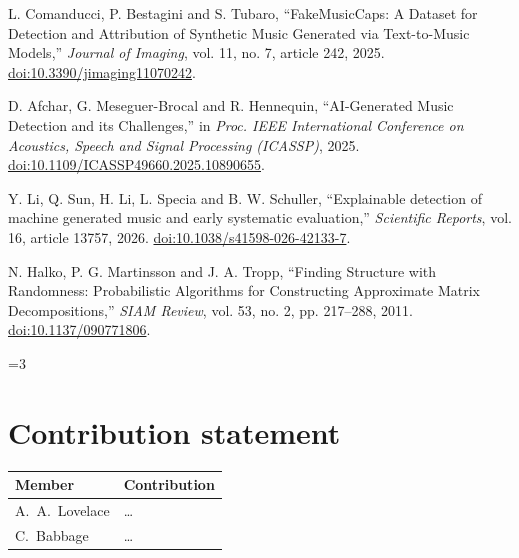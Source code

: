 \documentclass[11pt,a4paper]{article}
\newcommand{\stage}{1}
\newif\ifshowguide
\theoremstyle{plain}
\theoremstyle{definition}
\theoremstyle{remark}
\newcommand{\guide}[1]{\ifshowguide\par\smallskip\noindent
  \colorbox{gray!12}{\parbox{\dimexpr\linewidth-2\fboxsep}{\small\itshape
  \textbf{Guidance.} #1}}\par\smallskip\fi}
\begin{document}
\begin{thebibliography}{9}

L. Comanducci, P. Bestagini and S. Tubaro,
``FakeMusicCaps: A Dataset for Detection and Attribution of Synthetic Music Generated via Text-to-Music Models,''
\emph{Journal of Imaging}, vol. 11, no. 7, article 242, 2025.
\href{https://doi.org/10.3390/jimaging11070242}{doi:10.3390/jimaging11070242}.

D. Afchar, G. Meseguer-Brocal and R. Hennequin,
``AI-Generated Music Detection and its Challenges,'' in
\emph{Proc. IEEE International Conference on Acoustics, Speech and Signal Processing (ICASSP)}, 2025.
\href{https://doi.org/10.1109/ICASSP49660.2025.10890655}{doi:10.1109/ICASSP49660.2025.10890655}.

Y. Li, Q. Sun, H. Li, L. Specia and B. W. Schuller,
``Explainable detection of machine generated music and early systematic evaluation,''
\emph{Scientific Reports}, vol. 16, article 13757, 2026.
\href{https://doi.org/10.1038/s41598-026-42133-7}{doi:10.1038/s41598-026-42133-7}.

N. Halko, P. G. Martinsson and J. A. Tropp,
``Finding Structure with Randomness: Probabilistic Algorithms for Constructing Approximate Matrix Decompositions,''
\emph{SIAM Review}, vol. 53, no. 2, pp. 217--288, 2011.
\href{https://doi.org/10.1137/090771806}{doi:10.1137/090771806}.

\end{thebibliography}

\ifnum\stage=3
\appendix

\section{Contribution statement}

\guide{Required. Who did what, agreed by all members. Staff may adjust
an individual grade if contributions are clearly unequal.}

\noindent
\begin{tabularx}{\linewidth}{@{}lX@{}}
  \toprule
  Member & Contribution \\
  \midrule
  A.~A.~Lovelace & \dots \\
  C.~Babbage     & \dots \\
  \bottomrule
\end{tabularx}
\end{document}
